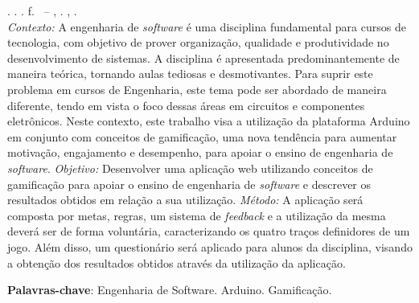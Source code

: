 
\begin{resumo}[RESUMO]
\begin{SingleSpacing}

\imprimirautorcitacao. \imprimirtitulo. \imprimirdata. \pageref {LastPage} f. \imprimirprojeto\ – \imprimirprograma, \imprimirinstituicao. \imprimirlocal, \imprimirdata.\\
\textit{Contexto:} A engenharia de \textit{software} é uma disciplina fundamental para cursos de tecnologia, com objetivo de prover organização, qualidade e produtividade no desenvolvimento de sistemas. A disciplina é apresentada predominantemente de maneira teórica, tornando aulas tediosas e desmotivantes. Para suprir este problema em cursos de Engenharia, este tema pode ser abordado de maneira diferente, tendo em vista o foco dessas áreas em circuitos e componentes eletrônicos. Neste contexto, este trabalho visa a utilização da plataforma Arduino em conjunto com conceitos de gamificação, uma nova tendência para aumentar motivação, engajamento e desempenho, para apoiar o ensino de engenharia de \textit{software}. \textit{Objetivo:} Desenvolver uma aplicação web utilizando conceitos de gamificação para apoiar o ensino de engenharia de \textit{software} e descrever os resultados obtidos em relação a sua utilização. \textit{Método:} A aplicação será composta por metas, regras, um sistema de \textit{feedback} e a utilização da mesma deverá ser de forma voluntária, caracterizando os quatro traços definidores de um jogo. Além disso, um questionário será aplicado para alunos da disciplina, visando a obtenção dos resultados obtidos através da utilização da aplicação. 

\textbf{Palavras-chave}: Engenharia de Software. Arduino. Gamificação.

\end{SingleSpacing}
\end{resumo}

